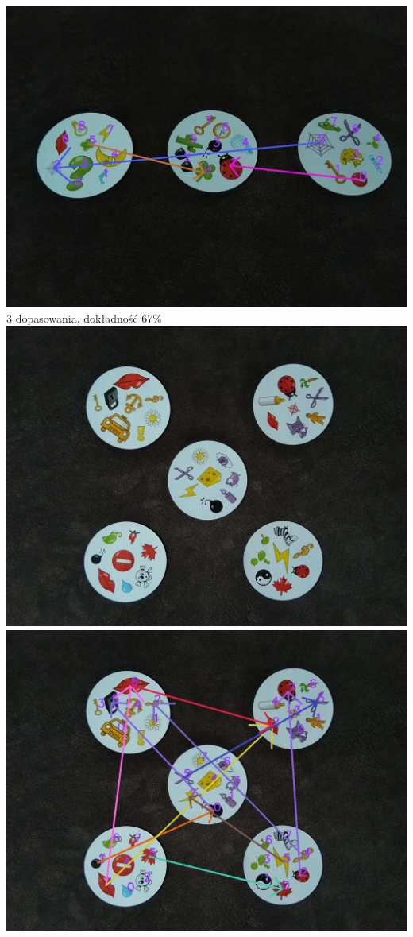 \documentclass[10pt,a4paper]{article}
\begin{document}
\begin{center}
\includegraphics[scale=0.28]{medium/img_arrows2.jpg}\\
3 dopasowania, dokładność 67\%
\includegraphics[scale=0.28]{medium/dobble08.jpg}
\includegraphics[scale=0.28]{medium/img_arrows3.jpg}\\

\end{center}
\end{document}
